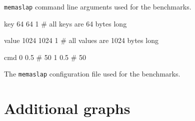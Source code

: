 \documentclass[12pt,chapterprefix=true,toc=bibliography,numbers=noendperiod,
               footnotes=multiple,twoside]{scrreprt}
\begin{document}
\begin{listing}[H]
    \caption{\texttt{memaslap} command line arguments used for the benchmarks.}
    \label{lst:memaslap-args}
\end{listing}

\begin{listing}[H]
    \begin{bashcode}
key
64      64      1   # all keys are 64 bytes long

value
1024    1024    1   # all values are 1024 bytes long

cmd
0   0.5             # 50%
1   0.5             # 50%
    \end{bashcode}
    \caption{The \texttt{memaslap} configuration file used for the benchmarks.}
    \label{lst:memaslap-conf}
\end{listing}

\newpage
\section{Additional graphs}
\end{document}
